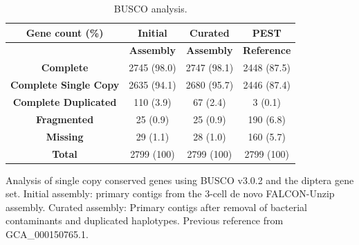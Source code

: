 \begin{table}[htbp!]
\caption{BUSCO analysis.}\label{table:busco}
\begin{tabular}{| c | c | c | c |}
\hline
 \textbf{Gene count (\%)} & \textbf{Initial} & \textbf{Curated} & \textbf{PEST} \\\hline
   & \textbf{Assembly} & \textbf{Assembly} & \textbf{Reference} \\\hline
 \textbf{Complete} & 2745 (98.0) & 2747 (98.1) & 2448 (87.5) \\\hline
  \textbf{Complete Single Copy} & 2635 (94.1) & 2680 (95.7) & 2446 (87.4)  \\\hline 
  \textbf{Complete Duplicated} & 110 (3.9) & 67 (2.4) & 3 (0.1) \\\hline 
  \textbf{Fragmented} & 25 (0.9) & 25 (0.9) & 190 (6.8) \\\hline 
  \textbf{Missing} & 29 (1.1) & 28 (1.0) & 160 (5.7) \\\hline 
   \textbf{Total} & 2799 (100) & 2799 (100) & 2799 (100) \\\hline
  
\end{tabular}
\par{ Analysis of single copy conserved genes using BUSCO v3.0.2 and the diptera gene set. Initial assembly: primary contigs from the 3-cell de novo FALCON-Unzip assembly. Curated assembly: Primary contigs after removal of bacterial contaminants and duplicated haplotypes. Previous reference from \cite{PEST}
GCA\_000150765.1.}
\end{table}




